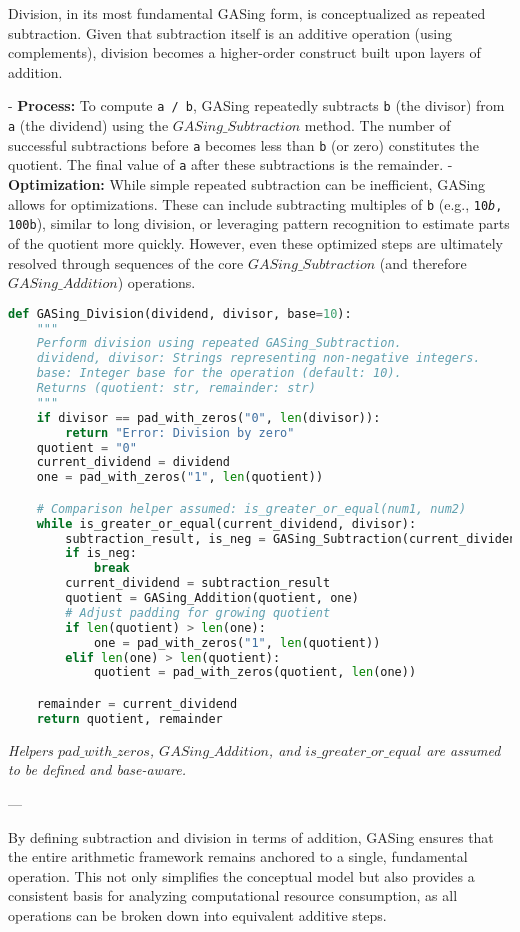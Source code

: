 Division, in its most fundamental GASing form, is conceptualized as repeated subtraction. Given that subtraction itself is an additive operation (using complements), division becomes a higher-order construct built upon layers of addition.

- \textbf{Process:} To compute \texttt{a / b}, GASing repeatedly subtracts \texttt{b} (the divisor) from \texttt{a} (the dividend) using the \texttt{$GASing\_{Subtraction}$} method. The number of successful subtractions before \texttt{a} becomes less than \texttt{b} (or zero) constitutes the quotient. The final value of \texttt{a} after these subtractions is the remainder.
- \textbf{Optimization:} While simple repeated subtraction can be inefficient, GASing allows for optimizations. These can include subtracting multiples of \texttt{b} (e.g., \texttt{10\emph{b}, \texttt{100}b}), similar to long division, or leveraging pattern recognition to estimate parts of the quotient more quickly. However, even these optimized steps are ultimately resolved through sequences of the core \texttt{$GASing\_{Subtraction}$} (and therefore \texttt{$GASing\_{Addition}$}) operations.

\begin{lstlisting}[language=Python,caption={GASing\_Division Algorithm}]
def GASing_Division(dividend, divisor, base=10):
    """
    Perform division using repeated GASing_Subtraction.
    dividend, divisor: Strings representing non-negative integers.
    base: Integer base for the operation (default: 10).
    Returns (quotient: str, remainder: str)
    """
    if divisor == pad_with_zeros("0", len(divisor)):
        return "Error: Division by zero"
    quotient = "0"
    current_dividend = dividend
    one = pad_with_zeros("1", len(quotient))

    # Comparison helper assumed: is_greater_or_equal(num1, num2)
    while is_greater_or_equal(current_dividend, divisor):
        subtraction_result, is_neg = GASing_Subtraction(current_dividend, divisor, base)
        if is_neg:
            break
        current_dividend = subtraction_result
        quotient = GASing_Addition(quotient, one)
        # Adjust padding for growing quotient
        if len(quotient) > len(one):
            one = pad_with_zeros("1", len(quotient))
        elif len(one) > len(quotient):
            quotient = pad_with_zeros(quotient, len(one))

    remainder = current_dividend
    return quotient, remainder
\end{lstlisting}

\emph{Helpers \texttt{$pad\_with\_{zeros}$}, \texttt{$GASing\_{Addition}$}, and \texttt{$is\_greater\_or\_{equal}$} are assumed to be defined and base-aware.}

---

By defining subtraction and division in terms of addition, GASing ensures that the entire arithmetic framework remains anchored to a single, fundamental operation. This not only simplifies the conceptual model but also provides a consistent basis for analyzing computational resource consumption, as all operations can be broken down into equivalent additive steps.
